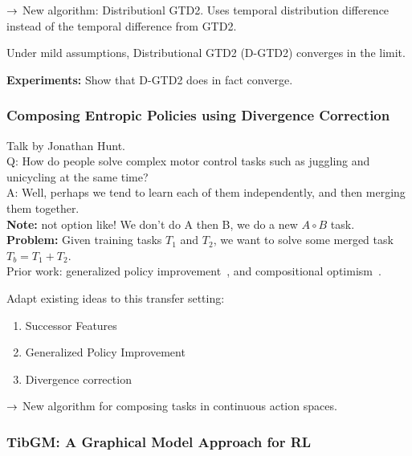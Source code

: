$\rightarrow$ New algorithm: Distributionl GTD2. Uses temporal distribution difference instead of the temporal difference from GTD2. 

\begin{theorem}
Under mild assumptions, Distributional GTD2 (D-GTD2) converges in the limit.
\end{theorem}

{\bf Experiments:} Show that D-GTD2 does in fact converge.

\spacerule

\subsubsection{Composing Entropic Policies using Divergence Correction~\cite{hunt2018composing}}

Talk by Jonathan Hunt. \\

Q: How do people solve complex motor control tasks such as juggling and unicycling at the same time? \\

A: Well, perhaps we tend to learn each of them independently, and then merging them together. \\

{\bf Note:} not option like! We don't do A then B, we do a new $A \circ B$ task. \\

{\bf Problem:} Given training tasks $T_1$ and $T_2$, we want to solve some merged task $T_b = T_1 + T_2$. \\

Prior work: generalized policy improvement~\cite{barreto2017successor}, and compositional optimism~\cite{Haarnoja}.

Adapt existing ideas to this transfer setting:
\begin{enumerate}
    \item Successor Features
    \item Generalized Policy Improvement
    \item Divergence correction
\end{enumerate}

$\rightarrow$ New algorithm for composing tasks in continuous action spaces. \\

\spacerule

\subsubsection{TibGM: A Graphical Model Approach for RL~\cite{adel2019tibgm}}

